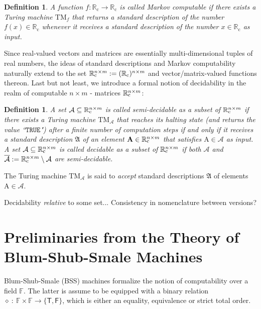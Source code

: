 \documentclass[conference]{IEEEtran}
\def\A{{\mathcal A}}
\def\RR{{\mathbb R}}
\newcommand{\RRc}{\RR_{\mathrm{c}}}
\def\FF{{\mathbb F}}
\def\mA{\bm{\mathrm{A}}}
\newcommand{\TM}{\mathrm{TM}}
\newcommand{\RRcP}[1]{\mathrlap{\phantom{\RR}_{\mathrm{c}}}\RR^{#1}}
\newtheorem{Definition}[Theorem]{Definition}
\begin{document}
	\begin{Definition}  \label{Borel}
						A function \(f : \RRc \to \RRc\) is called Markov computable %
						if there exists a Turing machine \(\TM_f\) that returns a standard description
						of the number \(f(x) \in \RRc\) whenever it receives a standard description of the number \(x\in \RRc\) as input.
	\end{Definition}

	\noindent Since real-valued vectors and matrices are essentially multi-dimensional tuples of real numbers, the ideas of standard descriptions and 
	Markov computability naturally extend to the set \(\RRcP{n\times m} := (\RRc)^{n\times m}\) and vector/matrix-valued functions thereon. 
	Last but not least, we introduce a formal notion of decidability in the realm of computable \(n\times m\) - matrices \(\RRcP{n\times m}\):

	\begin{Definition}  \label{semi}
						A set \(\A \subseteq \RRcP{n\times m}\) is called \emph{semi-decidable} as a subset of \(\RRcP{n\times m}\) 
						if there exists a Turing machine \(\TM_{\A}\) that reaches its halting state (and returns the value ``\(\mathtt{TRUE}\)") 
						after a finite number of computation steps if and only if it receives a standard description \(\mathfrak{A}\) of an element 
						\(\mA \in \RRcP{n\times m}\) that satisfies \(\mA\in\A\) as input. A set \(\A \subseteq \RRcP{n\times m}\) is called 
						\emph{decidable} as a subset of \(\RRcP{n\times m}\) if both \(\A\) and \(\overline{\A} := \RRcP{n\times m}\setminus\A\) are semi-decidable.
	\end{Definition} 

	\noindent The Turing machine \(\TM_\A\) is said to \emph{accept} standard descriptions \(\mathfrak{A}\) of elements \(\mA\in\A\).
	
	{\color{red} Decidability \emph{relative} to some set... Consistency in nomenclature between versions?}

\section{Preliminaries from the Theory of Blum-Shub-Smale Machines}	\label{sec:PreliminariesBSS}	    	
	\noindent Blum-Shub-Smale (BSS) machines formalize the notion of computability over a field \(\FF\). The latter is assume to be equipped 
	with a binary relation \(\diamond~{:}~\FF \times \FF \rightarrow \{\mathsf{T},\mathsf{F}\}\), which is either an equality, equivalence or strict total order. 
	
\end{document}
